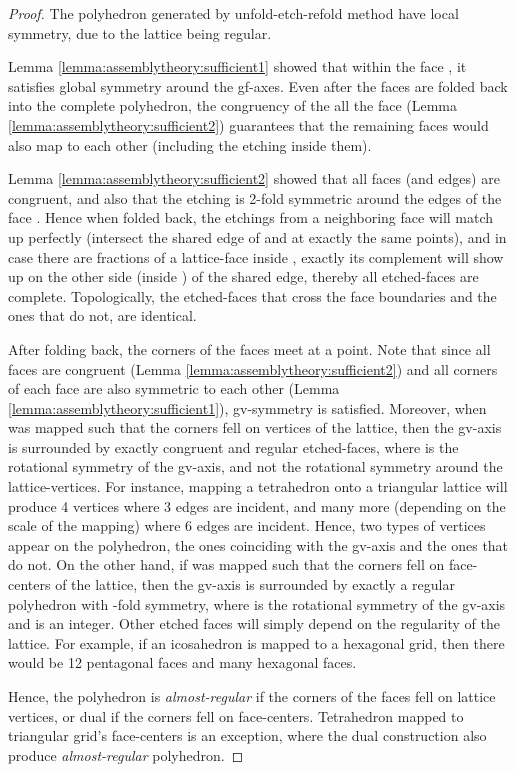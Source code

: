 \documentclass[11pt]{article}
\newcommand{\1}{\mathds{1}}
\begin{document}
\begin{proof}
 The polyhedron generated by unfold-etch-refold method have local symmetry, due to the lattice being regular.
 
 Lemma \ref{lemma:assemblytheory:sufficient1} showed that within the face , it satisfies global symmetry around the gf-axes. Even after the faces are folded back into the complete polyhedron, the congruency of the all the face (Lemma \ref{lemma:assemblytheory:sufficient2}) guarantees that the remaining faces would also map to each other (including the etching inside them). 

 Lemma \ref{lemma:assemblytheory:sufficient2} showed that all faces (and edges) are congruent, and also that the etching is 2-fold symmetric around the edges of the face . Hence when folded back, the etchings from a neighboring face  will match up perfectly (intersect the shared edge of  and  at exactly the same points), and in case there are fractions of a lattice-face inside , exactly its complement will show up on the other side (inside ) of the shared edge, thereby all etched-faces are complete. Topologically, the etched-faces that cross the face boundaries and the ones that do not, are identical. 

 After folding back, the corners of the faces  meet at a point. Note that since all faces are congruent (Lemma \ref{lemma:assemblytheory:sufficient2}) and all corners of each face are also symmetric to each other (Lemma \ref{lemma:assemblytheory:sufficient1}), gv-symmetry is satisfied. Moreover, when  was mapped such that the corners fell on vertices of the lattice, then the gv-axis is surrounded by exactly  congruent and regular etched-faces, where  is the rotational symmetry of the gv-axis, and not the rotational symmetry around the lattice-vertices. For instance, mapping a tetrahedron onto a triangular lattice will produce 4 vertices where 3 edges are incident, and many more (depending on the scale of the mapping) where 6 edges are incident. Hence, two types of vertices appear on the polyhedron, the ones coinciding with the gv-axis and the ones that do not. On the other hand, if  was mapped such that the corners fell on face-centers of the lattice, then the gv-axis is surrounded by exactly a regular polyhedron with -fold symmetry, where  is the rotational symmetry of the gv-axis and  is an integer. Other etched faces will simply depend on the regularity of the lattice. For example, if an icosahedron is mapped to a hexagonal grid, then there would be 12 pentagonal faces and many hexagonal faces. 

 Hence, the polyhedron is \emph{almost-regular} if the corners of the faces fell on lattice vertices, or dual if the corners fell on face-centers. Tetrahedron mapped to triangular grid's face-centers is an exception, where the dual construction also produce \emph{almost-regular} polyhedron. 
\end{proof}
\end{document}
